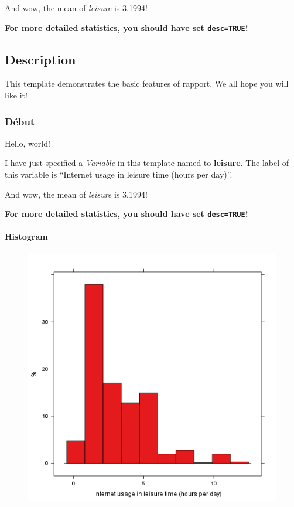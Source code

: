 \documentclass{article}
\makeatletter
\def\maxwidth{\ifdim\Gin@nat@width>\linewidth\linewidth
\else\Gin@nat@width\fi}
\let\Oldincludegraphics\includegraphics
\renewcommand{\includegraphics}[1]{\Oldincludegraphics[width=\maxwidth]{#1}}
\makeatother
\begin{document}
And wow, the mean of \emph{leisure} is 3.1994!

\textbf{For more detailed statistics, you should have set
\texttt{desc=TRUE}!}

\subsection{Description}

This template demonstrates the basic features of rapport. We all hope
you will like it!

\subsubsection{Début}

Hello, world!

I have just specified a \emph{Variable} in this template named to
\textbf{leisure}. The label of this variable is ``Internet usage in
leisure time (hours per day)''.

And wow, the mean of \emph{leisure} is 3.1994!

\textbf{For more detailed statistics, you should have set
\texttt{desc=TRUE}!}

\paragraph{Histogram}

\begin{figure}[htbp]
\centering
\includegraphics{9542b7929dcd934208ee4f18bde6ff31.png}
\caption{}
\end{figure}
\end{document}
